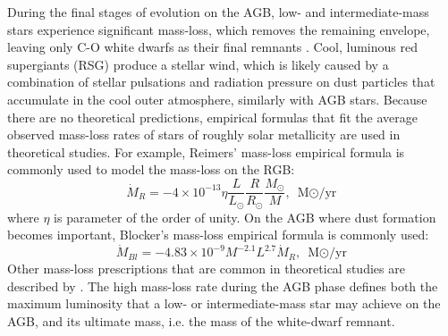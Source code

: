 During the final stages of evolution on the AGB, low- and intermediate-mass stars experience significant mass-loss, which removes the remaining envelope, leaving only C-O white dwarfs as their final remnants \citep{marigo2007evolution, pols2011stellar}. Cool, luminous red supergiants (RSG) produce a stellar wind, which is likely caused by a combination of stellar pulsations and radiation pressure on dust particles that accumulate in the cool outer atmosphere, similarly with AGB stars. Because there are no theoretical predictions, empirical formulas that fit the average observed mass-loss rates of stars of roughly solar metallicity are used in theoretical studies. For example, Reimers' mass-loss empirical formula \citep{reimers1975circumstellar} is commonly used to model the mass-loss on the RGB:
\begin{equation}\label{eq:reimer}
    \dot{M}_{R} = -4 \times 10^{-13} \eta 
    \frac{L}{L_{\odot}}  \frac{R}{R_{\odot}} \frac{M_{\odot}}{M},
    \text{ M${\odot}$/yr}
\end{equation}
where $\eta$ is parameter of the order of unity. On the AGB where dust formation becomes important, Blocker's mass-loss empirical formula \citep{bloecker1995stellarI,bloecker1995stellarII} is commonly used:
\begin{equation}\label{eq:blocker}
    \dot{M}_{Bl} = -4.83 \times 10^{-9} M^{-2.1} L^{2.7} \dot{M}_{R},
    \text{ M${\odot}$/yr}
\end{equation}
Other mass-loss prescriptions that are common in theoretical studies are described by \cite{de1988mass,nieuwenhuijzen1990parametrization}. The high mass-loss rate during the AGB phase defines both the maximum luminosity that a low- or intermediate-mass star may achieve on the AGB, and its ultimate mass, i.e. the mass of the white-dwarf remnant.

